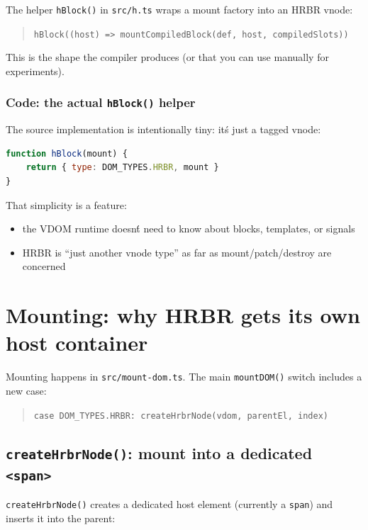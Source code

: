 The helper \texttt{hBlock()} in \texttt{src/h.ts} wraps a mount factory into an HRBR vnode:

\begin{quote}
\texttt{hBlock((host) => mountCompiledBlock(def, host, compiledSlots))}
\end{quote}

This is the shape the compiler produces (or that you can use manually for experiments).

\subsubsection*{Code: the actual \texttt{hBlock()} helper}

The source implementation is intentionally tiny: it\'s just a tagged vnode:

\begin{lstlisting}[language=JavaScript]
function hBlock(mount) {
	return { type: DOM_TYPES.HRBR, mount }
}
\end{lstlisting}

That simplicity is a feature:

\begin{itemize}
\item the VDOM runtime doesn\'t need to know about blocks, templates, or signals
\item HRBR is ``just another vnode type'' as far as mount/patch/destroy are concerned
\end{itemize}

\section{Mounting: why HRBR gets its own host container}

Mounting happens in \texttt{src/mount-dom.ts}. The main \texttt{mountDOM()} switch includes a new case:

\begin{quote}
\texttt{case DOM\_TYPES.HRBR: createHrbrNode(vdom, parentEl, index)}
\end{quote}

\subsection{\texttt{createHrbrNode()}: mount into a dedicated \texttt{<span>}}

\texttt{createHrbrNode()} creates a dedicated host element (currently a \texttt{span}) and inserts it into the parent:

